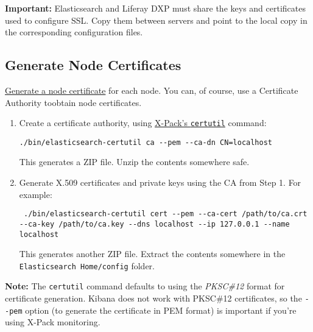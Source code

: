 \noindent\hrulefill

\textbf{Important:} Elasticsearch and Liferay DXP must share the keys
and certificates used to configure SSL. Copy them between servers and
point to the local copy in the corresponding configuration files.

\noindent\hrulefill

\subsection{Generate Node Certificates}\label{generate-node-certificates}

\href{https://www.elastic.co/guide/en/elasticsearch/reference/6.5/configuring-tls.html\#node-certificates}{Generate
a node certificate} for each node. You can, of course, use a Certificate
Authority toobtain node certificates.

\begin{enumerate}
\def\labelenumi{\arabic{enumi}.}
\item
  Create a certificate authority, using
  \href{https://www.elastic.co/guide/en/elasticsearch/reference/6.5/certutil.html}{X-Pack's
  \texttt{certutil}} command:

\begin{verbatim}
./bin/elasticsearch-certutil ca --pem --ca-dn CN=localhost
\end{verbatim}

  This generates a ZIP file. Unzip the contents somewhere safe.
\item
  Generate X.509 certificates and private keys using the CA from Step 1.
  For example:

\begin{verbatim}
 ./bin/elasticsearch-certutil cert --pem --ca-cert /path/to/ca.crt --ca-key /path/to/ca.key --dns localhost --ip 127.0.0.1 --name localhost
\end{verbatim}

  This generates another ZIP file. Extract the contents somewhere in the
  \texttt{Elasticsearch\ Home/config} folder.
\end{enumerate}

\noindent\hrulefill

\textbf{Note:} The \texttt{certutil} command defaults to using the
\emph{PKSC\#12} format for certificate generation. Kibana does not work
with PKSC\#12 certificates, so the \texttt{-\/-pem} option (to generate
the certificate in PEM format) is important if you're using X-Pack
monitoring.

